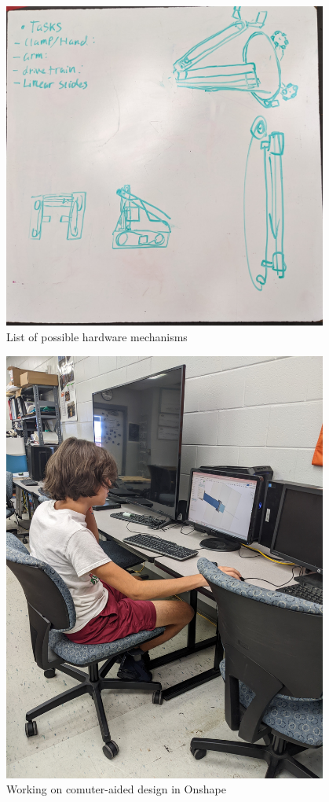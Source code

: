\begin{figure}[htp]
\centering
\includegraphics[width=0.95\textwidth, angle=0]{Meetings/September/09-15-22/09-15-22-Hardware.jpg}
\caption{List of possible hardware mechanisms}
\label{fig:pic3}
\end{figure}

\begin{figure}[htp]
\centering
\includegraphics[width=0.95\textwidth, angle=0]{Meetings/September/09-15-22/09-15-22-meeting.jpg}
\caption{Working on comuter-aided design in Onshape}
\label{fig:pic3}
\end{figure}


